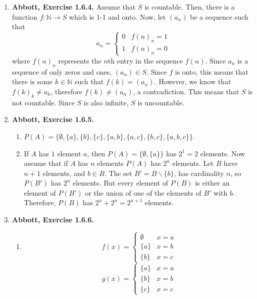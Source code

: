 \documentclass{article}
\newcommand{\N}{\mathbb{N}}
\newcommand{\exc}[2][Abbott]{\item \textbf{#1, Exercise #2.}}
\begin{document}
\begin{enumerate}
	\exc{1.6.4}
	Assume that $S$ is countable. Then, there is a function $f : \N \rightarrow S$ which is 1-1 and onto. Now, let $(a_n)$ be a sequence such that \begin{equation*}
	a_n = \begin{cases}
	0 & f(n)_n = 1 \\ 
	1 & f(n)_n = 0
	\end{cases}
	\end{equation*}
	where $f(n)_n$ represents the $n$th entry in the sequence $f(n)$. Since $a_n$ is a sequence of only zeros and ones, $(a_n) \in S$. Since $f$ is onto, this means that there is some $k \in \N$ such that $f(k) = (a_n)$. However, we know that $f(k)_k \neq a_k$, therefore $f(k) \neq (a_n)$, a contradiction. This means that $S$ is not countable. Since $S$ is also infinite, $S$ is uncountable.
					    
	\exc{1.6.5}
				      	          
	\begin{enumerate}
		\item $P(A) = \{\emptyset, \{a\}, \{b\}, \{c\}, \{a, b\}, \{a, c\}, \{b, c\}, \{a, b, c\}\}$.
		      		      		      	      	      	      	              
		\item If $A$ has $1$ element $a$, then $P(A) = \{\emptyset, \{a\}\}$ has $2^1 = 2$ elements. Now assume that if $A$ has $n$ elements $P(A)$ has $2^n$ elements. Let $B$ have $n + 1$ elements, and $b \in B$. The set $B' = B \backslash \{b\}$, has cardinality $n$, so $P(B')$ has $2^n$ elements. But every element of $P(B)$ is either an element of $P(B')$ or the union of one of the elements of $B'$ with $b$. Therefore, $P(B)$ has $2^n + 2^n = 2^{n+1}$ elements.
	\end{enumerate}
				      	          
	\exc{1.6.6}
				      	          
	\begin{enumerate}
		\item \begin{equation*}
		      f(x) = \begin{cases}
		      \emptyset & x = a \\
		      \{a\} & x = b \\
		      \{b\} & x = c
		\end{cases}
		\end{equation*}
		\begin{equation*}
			g(x) = \begin{cases}
			\{a\} & x = a \\
			\{b\} & x = b \\
			\{c\} & x = c
			\end{cases}
		\end{equation*}
							      		      	        

\end{enumerate}
\end{enumerate}
\end{document}
